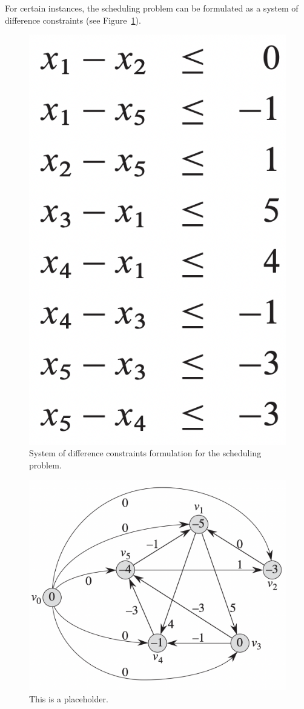 For certain instances, the scheduling problem can be formulated as a system of difference constraints (see Figure~\ref{fig:sdc_constraints}).
\begin{figure}[H]
	\includegraphics[height=\columnwidth]{figures/sdc_constraints}
	\caption{System of difference constraints formulation for the scheduling problem.}
	\label{fig:sdc_constraints}
\end{figure}
\begin{figure}
	\includegraphics[width=\columnwidth]{figures/sdc_graph}
	\caption{This is a placeholder.}
	\label{fig:sdc_graph}
\end{figure}

